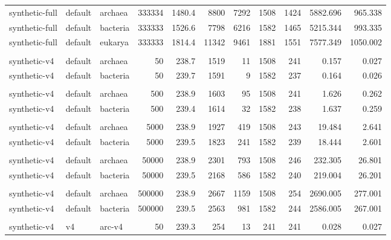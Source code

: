\begin{table}
\begin{center}
\begin{tabular}{lllrrrrrrrr}
synthetic-full  & default  & archaea  &  333334 & 1480.4 &  8800 &  7292 &  1508 &  1424 &   5882.696 &    965.338 \\
synthetic-full  & default  & bacteria &  333333 & 1526.6 &  7798 &  6216 &  1582 &  1465 &   5215.344 &    993.335 \\
synthetic-full  & default  & eukarya  &  333333 & 1814.4 & 11342 &  9461 &  1881 &  1551 &   7577.349 &   1050.002 \\ \hline
& & & & & & & & & & \\ \hline
synthetic-v4    & default  & archaea  &      50 &  238.7 &  1519 &    11 &  1508 &   241 &      0.157 &      0.027 \\
synthetic-v4    & default  & bacteria &      50 &  239.7 &  1591 &     9 &  1582 &   237 &      0.164 &      0.026 \\
& & & & & & & & & & \\ 
synthetic-v4    & default  & archaea  &     500 &  238.9 &  1603 &    95 &  1508 &   241 &      1.626 &      0.262 \\
synthetic-v4    & default  & bacteria &     500 &  239.4 &  1614 &    32 &  1582 &   238 &      1.637 &      0.259 \\
& & & & & & & & & & \\ 
synthetic-v4    & default  & archaea  &    5000 &  238.9 &  1927 &   419 &  1508 &   243 &     19.484 &      2.641 \\
synthetic-v4    & default  & bacteria &    5000 &  239.5 &  1823 &   241 &  1582 &   239 &     18.444 &      2.601 \\
& & & & & & & & & & \\ 
synthetic-v4    & default  & archaea  &   50000 &  238.9 &  2301 &   793 &  1508 &   246 &    232.305 &     26.801 \\
synthetic-v4    & default  & bacteria &   50000 &  239.5 &  2168 &   586 &  1582 &   240 &    219.004 &     26.201 \\
& & & & & & & & & & \\ 
synthetic-v4    & default  & archaea  &  500000 &  238.9 &  2667 &  1159 &  1508 &   254 &   2690.005 &    277.001 \\
synthetic-v4    & default  & bacteria &  500000 &  239.5 &  2563 &   981 &  1582 &   244 &   2586.005 &    267.001 \\ \hline
& & & & & & & & & & \\ \hline
synthetic-v4    & v4       & arc-v4   &      50 &  239.3 &   254 &    13 &   241 &   241 &      0.028 &      0.027 \\

\end{tabular}
\end{center}
\end{table}
